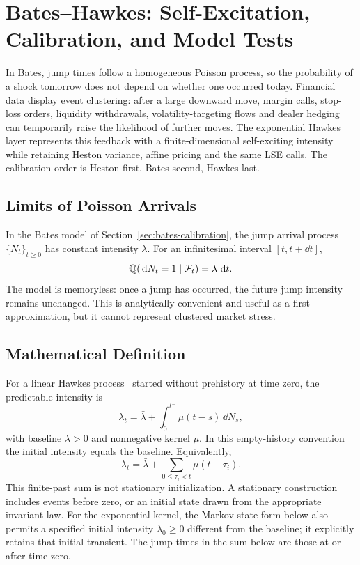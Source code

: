\section{Bates--Hawkes: Self-Excitation, Calibration, and Model Tests}

In Bates, jump times follow a homogeneous Poisson process, so the probability of a shock tomorrow does not depend on whether one occurred today. Financial data display event clustering: after a large downward move, margin calls, stop-loss orders, liquidity withdrawals, volatility-targeting flows and dealer hedging can temporarily raise the likelihood of further moves. The exponential Hawkes layer represents this feedback with a finite-dimensional self-exciting intensity while retaining Heston variance, affine pricing and the same LSE calls. The calibration order is Heston first, Bates second, Hawkes last.
\subsection{Limits of Poisson Arrivals}

In the Bates model of Section~\ref{sec:bates-calibration}, the jump arrival process \(\{N_t\}_{t\geq0}\) has constant intensity \(\lambda\). For an infinitesimal interval \([t,t+\dd t]\),
\begin{equation}
    \mathbb{Q}(\,\mathrm{d} N_t=1\mid\mathcal{F}_t)=\lambda\,\,\mathrm{d} t.
\end{equation}
The model is memoryless: once a jump has occurred, the future jump intensity remains unchanged. This is analytically convenient and useful as a first approximation, but it cannot represent clustered market stress.

\subsection{Mathematical Definition}
\label{sec:hawkes-definition}

For a linear Hawkes process~\cite{Hawkes1971} started without prehistory at time
zero, the predictable intensity is
\begin{equation}
\lambda_t=\bar\lambda+\int_0^{t^-}\mu(t-s)\,\dd N_s,
\end{equation}
with baseline $\bar\lambda>0$ and nonnegative kernel $\mu$. In this
empty-history convention the initial intensity equals the baseline.
Equivalently,
\begin{equation}
\lambda_t=\bar\lambda+\sum_{0\le\tau_i<t}\mu(t-\tau_i).
\end{equation}
This finite-past sum is not stationary initialization. A stationary
construction includes events before zero, or an initial state drawn
from the appropriate invariant law. For the exponential kernel, the
Markov-state form below also permits a specified initial intensity
$\lambda_0\ge0$ different from the baseline; it explicitly retains
that initial transient. The jump times in the sum below are those
at or after time zero.

